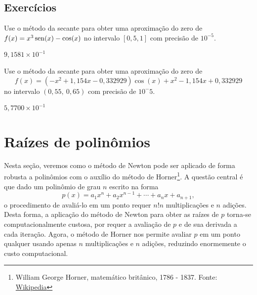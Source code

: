 \subsection*{Exercícios}

\begin{exer}\label{exer:secante_1}
  Use o método da secante para obter uma aproximação do zero de $f(x)=x^3\operatorname{sen}(x)-\cos(x)$ no intervalo $[0,5, 1]$ com precisão de $10^{-5}$.
\end{exer}
\begin{resp}
  $9,1581\times 10^{-1}$
\end{resp}

\begin{exer}\label{exer:secante_multpar}
  Use o método da secante para obter uma aproximação do zero de
  \begin{equation}
    f(x) = (-x^2+1,154x-0,332929)\cos(x) + x^2 - 1,154x + 0,332929
  \end{equation}
no intervalo $(0,55, ~0,65)$ com precisão de $10^-5$.
\end{exer}
\begin{resp}
  $5,7700\times 10^{-1}$
\end{resp}

\section{Raízes de polinômios}\label{cap_eq1d_sec_raizes}

Nesta seção, veremos como o método de Newton pode ser aplicado de forma robusta a polinômios com o auxílio do método de Horner\footnote{William George Horner, matemático britânico, 1786 - 1837. Fonte: \href{https://en.wikipedia.org/wiki/William_George_Horner}{Wikipedia}}. A questão central é que dado um polinômio de grau $n$ escrito na forma
\begin{equation}
  p(x) = a_{1}x^n + a_{2}x^{n-1} + \cdots + a_nx + a_{n+1},
\end{equation}
o procedimento de avaliá-lo em um ponto requer $n!n$ multiplicações e $n$ adições. Desta forma, a aplicação do método de Newton para obter as raízes de $p$ torna-se computacionalmente custosa, por requer a avaliação de $p$ e de sua derivada a cada iteração. Agora, o método de Horner nos permite avaliar $p$ em um ponto qualquer usando apenas $n$ multiplicações e $n$ adições, reduzindo enormemente o custo computacional.

